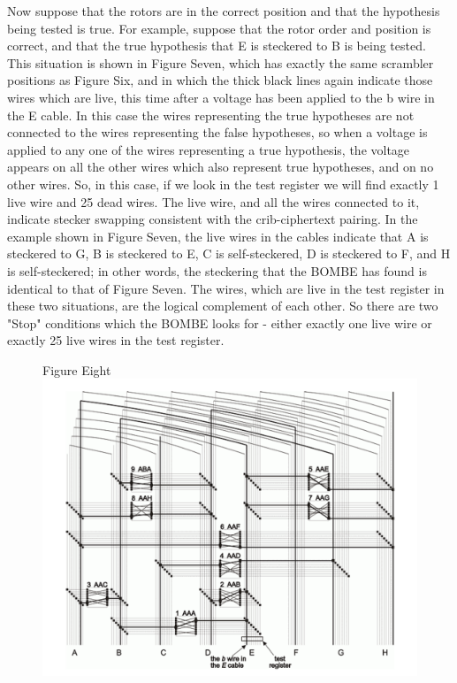 \documentclass[12pt,a4paper]{article}
\begin{document}
Now suppose that the rotors are in the correct position and that the hypothesis being tested is true. For example, suppose that the rotor order and position is correct, and that the true hypothesis that E is steckered to B is being tested. This situation is shown in Figure Seven, which has exactly the same scrambler positions as Figure Six, and in which the thick black lines again indicate those wires which are live, this time after a voltage has been applied to the b wire in the E cable. In this case the wires representing the true hypotheses are not connected to the wires representing the false hypotheses, so when a voltage is applied to any one of the wires representing a true hypothesis, the voltage appears on all the other wires which also represent true hypotheses, and on no other wires. So, in this case, if we look in the test register we will find exactly 1 live wire and 25 dead wires. The live wire, and all the wires connected to it, indicate stecker swapping consistent with the crib-ciphertext pairing. In the example shown in Figure Seven, the live wires in the cables indicate that A is steckered to G, B is steckered to E, C is self-steckered, D is steckered to F, and H is self-steckered; in other words, the steckering that the BOMBE has found is identical to that of Figure Seven. The wires, which are live in the test register in these two situations, are the logical complement of each other. So there are two "Stop" conditions which the BOMBE looks for - either exactly one live wire or exactly 25 live wires in the test register.

\begin{figure}[H]
\centering
Figure Eight
\includegraphics[width=\textwidth]{BOMBEfive.png}
\end{figure}
\end{document}
